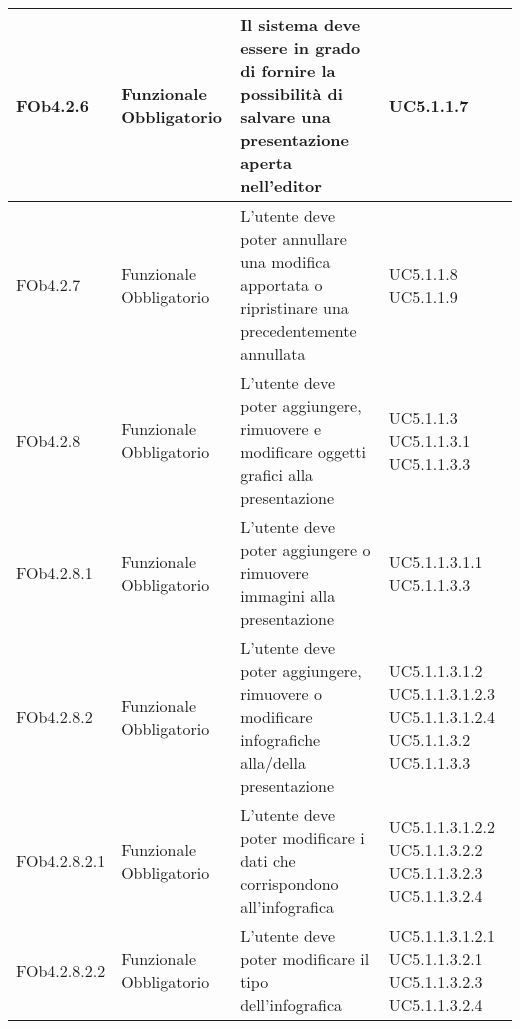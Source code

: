 \begin{longtable}{|l|p{2.5cm}|p{2cm}|l|}
\hline
FOb4.2.6 & Funzionale \linebreak Obbligatorio & Il sistema deve essere in grado di fornire la possibilità di salvare una presentazione aperta nell'editor & UC5.1.1.7 \linebreak  \\
\hline
FOb4.2.7 & Funzionale \linebreak Obbligatorio & L'utente deve poter annullare una modifica apportata o ripristinare una precedentemente annullata & UC5.1.1.8 \linebreak  UC5.1.1.9 \linebreak  \\
\hline
FOb4.2.8 & Funzionale \linebreak Obbligatorio & L'utente deve poter aggiungere, rimuovere e modificare oggetti grafici alla presentazione & UC5.1.1.3 \linebreak  UC5.1.1.3.1 \linebreak  UC5.1.1.3.3 \linebreak  \\
\hline
FOb4.2.8.1 & Funzionale \linebreak Obbligatorio & L'utente deve poter aggiungere o rimuovere immagini alla presentazione & UC5.1.1.3.1.1 \linebreak  UC5.1.1.3.3 \linebreak  \\
\hline
FOb4.2.8.2 & Funzionale \linebreak Obbligatorio & L'utente deve poter aggiungere, rimuovere o modificare infografiche  alla/della presentazione & UC5.1.1.3.1.2 \linebreak  UC5.1.1.3.1.2.3 \linebreak  UC5.1.1.3.1.2.4 \linebreak  UC5.1.1.3.2 \linebreak  UC5.1.1.3.3 \linebreak  \\
\hline
FOb4.2.8.2.1 & Funzionale \linebreak Obbligatorio & L'utente deve poter modificare i dati che corrispondono all'infografica  & UC5.1.1.3.1.2.2 \linebreak  UC5.1.1.3.2.2 \linebreak  UC5.1.1.3.2.3 \linebreak  UC5.1.1.3.2.4 \linebreak  \\
\hline
FOb4.2.8.2.2 & Funzionale \linebreak Obbligatorio & L'utente deve poter modificare il tipo dell'infografica  & UC5.1.1.3.1.2.1 \linebreak  UC5.1.1.3.2.1 \linebreak  UC5.1.1.3.2.3 \linebreak  UC5.1.1.3.2.4 \linebreak  \\

\end{longtable}
